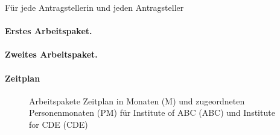 \documentclass[ngerman]{scrartcl}
\begin{document}
\addtocounter{secnumdepth}{1}
\renewcommand{\theparagraph}{AP\arabic{paragraph}}

Für jede Antragstellerin und jeden Antragsteller

\hrulefill
\paragraph{Erstes Arbeitspaket.}
\label{wp:1}



\hrulefill
\paragraph{Zweites Arbeitspaket.}
\label{wp:2}





\let\theparagraph=\oldpara
\paragraph*{Zeitplan}
\vspace{-0.5cm}
\begin{figure}[h]
	\centering
  	\resizebox{\textwidth}{!}{}
	\caption{Arbeitspakete Zeitplan in Monaten (M) und zugeordneten Personenmonaten (PM) f\"ur Institute of ABC (ABC) und Institute for CDE (CDE)}
	\label{fig:timeline}
\end{figure}
\end{document}
